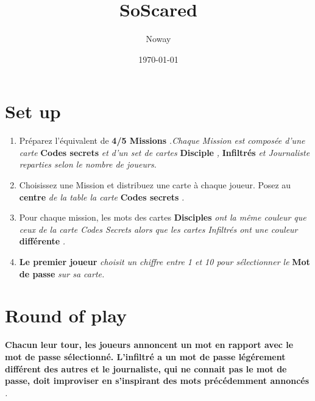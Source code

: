 \documentclass{article}%
\title{SoScared}%
\author{Noway}%
\date{\today}%
\begin{document}
%
\pagestyle{empty}%
\normalsize%
\maketitle%
\section{ Set up
}%
\label{sec:Setup}%
\begin{enumerate}%
\item%
%
 Préparez l'équivalent de %
\textbf{4/5 Missions}%
\textit{.Chaque Mission est composée d'une carte }%
\textbf{Codes secrets}%
\textit{ et d'un set de cartes }%
\textbf{Disciple}%
\textit{,}%
\textbf{ Infiltrés}%
\textit{ et Journaliste reparties selon le nombre de joueurs.
}%
\item%
%
 Choisissez une Mission et distribuez une carte à chaque joueur. Posez au %
\textbf{centre}%
\textit{ de la table la carte }%
\textbf{Codes secrets}%
\textit{.
}%
\item%
%
 Pour chaque mission, les mots des cartes %
\textbf{Disciples}%
\textit{ ont la même couleur que ceux de la carte Codes Secrets alors que les cartes Infiltrés ont une couleur }%
\textbf{différente}%
\textit{.
}%
\item%
%
\textbf{Le premier joueur}%
\textit{ choisit un chiffre entre 1 et 10 pour sélectionner le }%
\textbf{Mot de passe}%
\textit{ sur sa carte.
}%
\end{enumerate}

%
\section{ Round of play
}%
\label{sec:Roundofplay}%
\textbf{Chacun leur tour, les joueurs annoncent un mot en rapport avec le mot de passe sélectionné. L'infiltré a un mot de passe légérement différent des autres et le journaliste, qui ne connait pas le mot de passe, doit improviser en s'inspirant des mots précédemment annoncés}%
\textit{.
}

%
\end{document}
